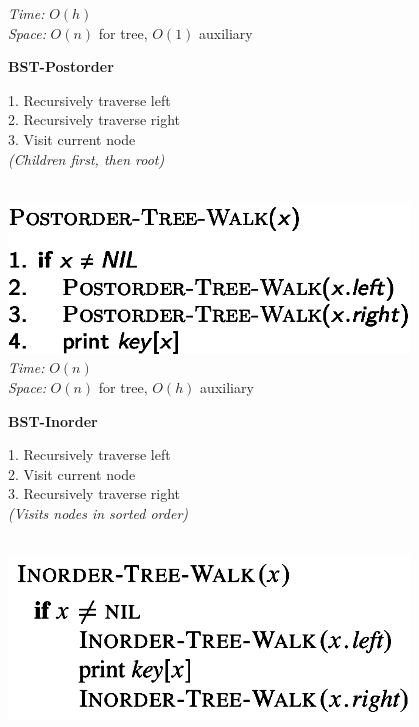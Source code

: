 {\begin{minipage}[t]{1\textwidth}
\begin{minipage}[t]{0.19\textwidth}
        \textit{Time:} \(O(h)\)\\
        \textit{Space:} \(O(n)\) for tree, \(O(1)\) auxiliary
    \end{minipage}
    \hfill
    \begin{minipage}[t]{0.19\textwidth}
        \centering
        \textbf{\scriptsize BST-Postorder}\\[2pt]
        \scriptsize
        \begin{minipage}[t]{\textwidth}
            \scriptsize
            1. Recursively traverse left\\
            2. Recursively traverse right\\
            3. Visit current node\\
            \textit{(Children first, then root)}
        \end{minipage}\\[4pt]
        \includegraphics[width=0.8\textwidth]{images/bst-postorder.png}\\[2pt]
        \textit{Time:} \(O(n)\)\\
        \textit{Space:} \(O(n)\) for tree, \(O(h)\) auxiliary
    \end{minipage}
    \hfill
    \begin{minipage}[t]{0.19\textwidth}
        \centering
        \textbf{\scriptsize BST-Inorder}\\[2pt]
        \scriptsize
        \begin{minipage}[t]{\textwidth}
            \scriptsize
            1. Recursively traverse left\\
            2. Visit current node\\
            3. Recursively traverse right\\
            \textit{(Visits nodes in sorted order)}
        \end{minipage}\\[4pt]
        \includegraphics[width=0.8\textwidth]{images/bst-inorder.png}\\[2pt]

\end{minipage}
\end{minipage}}
